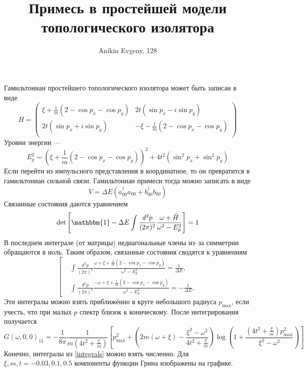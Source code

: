 \documentclass{article}
\title{Примесь в простейшей модели топологического изолятора}
\author{Anikin Evgeny, 128}
\begin{document}
\maketitle
Гамильтониан простейшего топологического изолятора может быть записан в виде
\begin{equation}
    H = \left(\begin{matrix}
            \xi + \frac{1}{m}(2 - \cos{p_x} - \cos{p_y}) & 2t(\sin{p_x} - i\sin{p_y})   \\
            2t(\sin{p_x} + i\sin{p_y}) & - \xi - \frac{1}{m}(2 - \cos{p_x} - \cos{p_y}) \\
        \end{matrix}\right)
\end{equation}
Уровни энергии ---
\begin{equation}
    E_p^2 = (\xi + \frac{1}{m}(2 - \cos{p_x} - \cos{p_y}))^2 + 4t^2(\sin^2{p_x} + \sin^2{p_y})
\end{equation}
Если перейти из импульсного представления в координатное, то он превратится в гамильтониан
сильной связи. Гамильтониан примеси тогда можно записать в виде
\begin{equation}
    V = \Delta E (a_{00}^\dagger a_{00} + b_{00}^\dagger b_{00})
\end{equation}
Связанные состояния даются уравнением
\begin{equation}    
    \det{\left[\mathbbm{1} - \Delta E \int \frac{d^2 p}{(2\pi)^2} 
            \frac{\omega + \hat{H}}{\omega^2 - E_p^2}\right]} = 1
\end{equation}
В последнем интеграле (от матрицы) недиагональные члены из--за симметрии обращаются в ноль.
Таким образом, связанные состояния сводятся к уравнениям
\begin{equation}
    \label{integrals}
    \left[
    \begin{split}
        &\int \frac{d^2 p}{(2\pi)^2} 
            \frac{\omega + \xi + \frac{1}{m}(2 - \cos{p_x} - \cos{p_y})}
                 {\omega^2 - E_p^2} = \frac{1}{\Delta E},\\
        &\int \frac{d^2 p}{(2\pi)^2} 
            \frac{-\omega + \xi + \frac{1}{m}(2 - \cos{p_x} - \cos{p_y})}
                 {\omega^2 - E_p^2} = -\frac{1}{\Delta E},
    \end{split}
    \right.
\end{equation}
Эти интегралы можно взять приближённо в круге небольшого радиуса $p_{\mathrm{max}}$,
если учесть, что при малых $p$ спектр близок к 
коническому. После интегрирования получается
\begin{equation}
    G(\omega,0,0)_{11} = -\frac{1}{8\pi}\frac{1}{m(4t^2 + \frac{\xi}{m})}
        \left[ p_{\mathrm{max}}^2 + 
            \left(2m(\omega+\xi) - \frac{\xi^2 - \omega^2}{4t^2 + \frac{\xi}{m}}\right) 
                \log{\left(1 + \frac{\left(4t^2 + \frac{\xi}{m}\right)p_{\mathrm{max}}^2}
                                    {\xi^2 - \omega^2}\right)}\right]
\end{equation}
Конечно, интегралы из \eqref{integrals} можно взять численно. Для 
$\xi, m, t = -0.03, 0.1, 0.5$ компоненты функции Грина изображены на графике.
\end{document}
